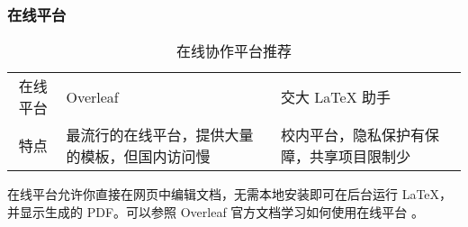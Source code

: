 \begin{frame}
  \frametitle{在线平台}
  \begin{table}
    \caption{在线协作平台推荐}
    \footnotesize
    \begin{stampbox}
      \begin{tabular}{c>{\raggedright}*{2}{p{4cm}}}
        \alert{在线平台}     & Overleaf   & 交大 \LaTeX{} 助手  \\[2pt]
        \alert{特点}      & 最流行的在线平台，提供大量的模板，但国内访问慢 & 校内平台，隐私保护有保障，共享项目限制少 \\
      \end{tabular}
    \end{stampbox}
  \end{table}
  \begin{center}
    \parbox{.9\textwidth}{
      在线平台允许你直接在网页中编辑文档，无需本地安装即可在后台运行 \LaTeX{}，并显示生成的 PDF。可以参照 Overleaf 官方文档学习如何使用在线平台 。
    }
  \end{center}
\end{frame}

